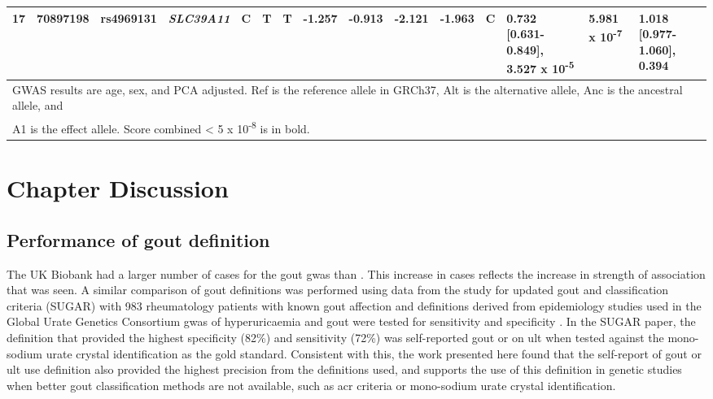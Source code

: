 \documentclass[twoside,openright]{report}
\begin{document}
\begin{landscape}
\begin{table}
{\begin{tabular}[t]{rrlllllllllllll}
\hspace{1em}17 & 70897198 & rs4969131 & \em{SLC39A11} & C & T & T & -1.257 & -0.913 & -2.121 & -1.963 & C & 0.732 [0.631-0.849], 3.527 x 10\textsuperscript{-5} & 5.981 x 10\textsuperscript{-7} & 1.018 [0.977-1.060], 0.394\\
\bottomrule
\multicolumn{15}{l}{GWAS results are age, sex, and PCA adjusted. Ref is the reference allele in GRCh37, Alt is the alternative allele, Anc is the ancestral allele, and}\\
\multicolumn{15}{l}{A1 is the effect allele. Score combined < 5 x 10\textsuperscript{-8} is in bold.}\\
\end{tabular}}
\end{table}
\end{landscape}

\section{Chapter Discussion}\label{chapter-discussion-1}

\subsection{Performance of gout
definition}\label{performance-of-gout-definition}

The UK Biobank had a larger number of cases for the gout \gls{gwas} than
\citet{Kottgen2013}. This increase in cases reflects the increase in
strength of association that was seen. A similar comparison of gout
definitions was performed using data from the study for updated gout and
classification criteria (SUGAR) with 983 rheumatology patients with
known gout affection and definitions derived from epidemiology studies
used in the Global Urate Genetics Consortium \gls{gwas} of
hyperuricaemia and gout were tested for sensitivity and specificity
\citep{Dalbeth2016}. In the SUGAR paper, the definition that provided
the highest specificity (82\%) and sensitivity (72\%) was self-reported
gout or on \gls{ult} when tested against the mono-sodium urate crystal
identification as the gold standard. Consistent with this, the work
presented here found that the self-report of gout or \gls{ult} use
definition also provided the highest precision from the definitions
used, and supports the use of this definition in genetic studies when
better gout classification methods are not available, such as \gls{acr}
criteria or mono-sodium urate crystal identification.
\end{document}
